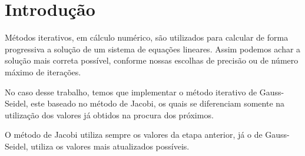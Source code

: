 \section*{Introdução}
Métodos iterativos, em cálculo numérico, são utilizados para calcular de
forma progressiva a solução de um sistema de equações lineares. Assim
podemos achar a solução mais correta possível, conforme nossas escolhas
de precisão ou de número máximo de iterações.

No caso desse trabalho, temos que implementar o método iterativo de
Gauss-Seidel, este baseado no método de Jacobi, os quais se diferenciam
somente na utilização dos valores já obtidos na procura dos próximos.

O método de Jacobi utiliza sempre os valores da etapa anterior, já o de
Gauss-Seidel, utiliza os valores mais atualizados possíveis.